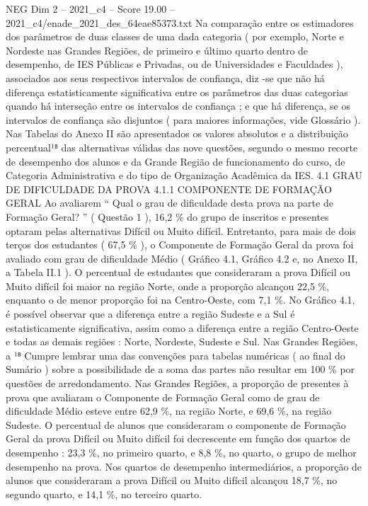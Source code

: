 \begin{textsample}{NEG Dim 2 – 2021\_c4 – Score 19.00 – 2021\_c4/enade\_2021\_des\_64eae85373.txt}
Na comparação entre os estimadores dos parâmetros de duas classes de uma dada categoria ( por exemplo, Norte e Nordeste nas Grandes Regiões, de primeiro e último quarto dentro de desempenho, de IES Públicas e Privadas, ou de Universidades e Faculdades ), associados aos seus respectivos intervalos de confiança, diz -se que não há diferença estatisticamente significativa entre os parâmetros das duas categorias quando há interseção entre os intervalos de confiança ; e que há diferença, se os intervalos de confiança são disjuntos ( para maiores informações, vide Glossário ).
Nas Tabelas do Anexo II são apresentados os valores absolutos e a distribuição percentual¹⁸ das alternativas válidas das nove questões, segundo o mesmo recorte de desempenho dos alunos e da Grande Região de funcionamento do curso, de Categoria Administrativa e do tipo de Organização Acadêmica da IES. 4.1 GRAU DE DIFICULDADE DA PROVA 4.1.1 COMPONENTE DE FORMAÇÃO GERAL Ao avaliarem “ Qual o grau de dificuldade desta prova na parte de Formação Geral? ” ( Questão 1 ), 16,2 \% do grupo de inscritos e presentes optaram pelas alternativas Difícil ou Muito difícil.
Entretanto, para mais de dois terços dos estudantes ( 67,5 \% ), o Componente de Formação Geral da prova foi avaliado com grau de dificuldade Médio ( Gráfico 4.1, Gráfico 4.2 e, no Anexo II, a Tabela II.1 ).
O percentual de estudantes que consideraram a prova Difícil ou Muito difícil foi maior na região Norte, onde a proporção alcançou 22,5 \%, enquanto o de menor proporção foi na Centro-Oeste, com 7,1 \%.
No Gráfico 4.1, é possível observar que a diferença entre a região Sudeste e a Sul é estatisticamente significativa, assim como a diferença entre a região Centro-Oeste e todas as demais regiões : Norte, Nordeste, Sudeste e Sul.
Nas Grandes Regiões, a ¹⁸ Cumpre lembrar uma das convenções para tabelas numéricas ( ao final do Sumário ) sobre a possibilidade de a soma das partes não resultar em 100 \% por questões de arredondamento.
Nas Grandes Regiões, a proporção de presentes à prova que avaliaram o Componente de Formação Geral como de grau de dificuldade Médio esteve entre 62,9 \%, na região Norte, e 69,6 \%, na região Sudeste.
O percentual de alunos que consideraram o componente de Formação Geral da prova Difícil ou Muito difícil foi decrescente em função dos quartos de desempenho : 23,3 \%, no primeiro quarto, e 8,8 \%, no quarto, o grupo de melhor desempenho na prova.
Nos quartos de desempenho intermediários, a proporção de alunos que consideraram a prova Difícil ou Muito difícil alcançou 18,7 \%, no segundo quarto, e 14,1 \%, no terceiro quarto.

\end{textsample}
